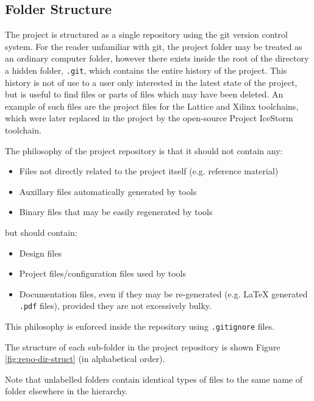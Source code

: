 \clearpage
\begin{appendices}
	
\chapter{Folder Structure} \label{sec:folder-struct}

The project is structured as a single repository using the git version control system. For the reader unfamiliar with git, the project folder may be treated as an ordinary computer folder, however there exists inside the root of the directory a hidden folder, \texttt{.git}, which contains the entire history of the project. This history is not of use to a user only interested in the latest state of the project, but is useful to find files or parts of files which may have been deleted. An example of such files are the project files for the Lattice and Xilinx toolchains, which were later replaced in the project by the open-source Project IceStorm toolchain.

The philosophy of the project repository is that it should not contain any:
\begin{itemize}
	\item Files not directly related to the project itself (e.g. reference material)
	\item Auxillary files automatically generated by tools
	\item Binary files that may be easily regenerated by tools
\end{itemize}
but should contain:
\begin{itemize}
	\item Design files
	\item Project files/configuration files used by tools
	\item Documentation files, even if they may be re-generated (e.g. \LaTeX{} generated \texttt{.pdf} files), provided they are not excessively bulky.
\end{itemize}
This philosophy is enforced inside the repository using \texttt{.gitignore} files.


The structure of each sub-folder in the project repository is shown Figure \ref{fig:repo-dir-struct} (in alphabetical order).

Note that unlabelled folders contain identical types of files to the same name of folder elsewhere in the hierarchy.


\end{appendices}
